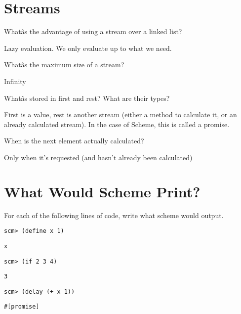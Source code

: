 \documentclass{exam}
\begin{document}
\section{Streams}
\begin{questions}
\begin{blocksection}
\question Whatâs the advantage of using a stream over a linked list?
\begin{solution}[0.5in] 
Lazy evaluation. We only evaluate up to what we need.
\end{solution}

\question Whatâs the maximum size of a stream?
\begin{solution}[0.5in]
Infinity
\end{solution}

\question Whatâs stored in first and rest? What are their types? 
\begin{solution}[0.5in]
First is a value, rest is another stream (either a method to calculate it, or an already calculated stream). In the case of Scheme, this is called a promise.
\end{solution}

\question When is the next element actually calculated?
\begin{solution}[.5in]
Only when it's requested (and hasn't already been calculated)
\end{solution}
\end{blocksection}


\section{What Would Scheme Print?}
\begin{blocksection}
\question For each of the following lines of code, write what scheme would output.

\begin{lstlisting}
scm> (define x 1)
\end{lstlisting}
\begin{solution}[.45in]
\texttt{x}
\end{solution}

\begin{lstlisting}
scm> (if 2 3 4)
\end{lstlisting}
\begin{solution}[.45in]
\texttt{3}
\end{solution}

\begin{lstlisting}
scm> (delay (+ x 1))
\end{lstlisting}
\begin{solution}[.45in]
\begin{lstlisting}
#[promise]
\end{lstlisting}
\end{solution}


\end{blocksection}
\end{questions}
\end{document}
